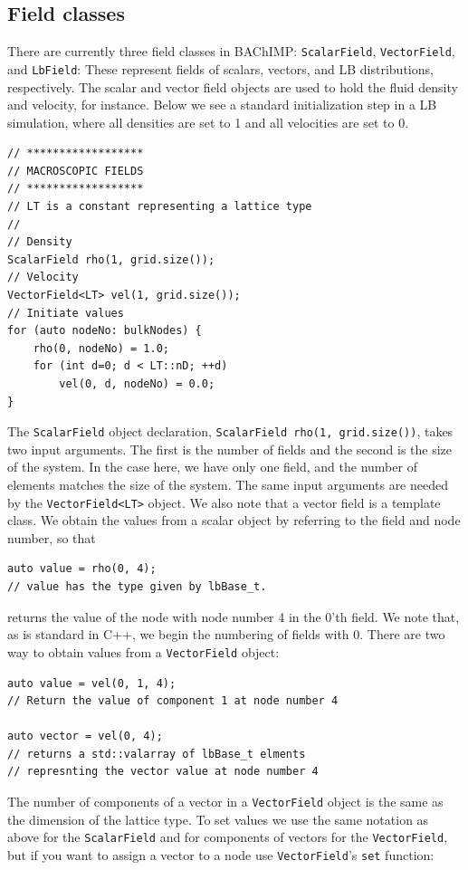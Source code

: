 \documentclass[11pt,a4paper]{report}
\begin{document}
\subsection{Field classes}
\label{sec:field classes}
There are currently three field classes in BAChIMP: \texttt{ScalarField}, \texttt{VectorField}, and \texttt{LbField}: These represent fields of scalars, vectors, and LB distributions, respectively. The scalar and vector field objects are used to hold the fluid density and velocity, for instance. Below we see a standard initialization step in a LB simulation, where all densities are set to 1 and all velocities are set to 0.
\begin{verbatim}
// ******************
// MACROSCOPIC FIELDS
// ******************
// LT is a constant representing a lattice type
//
// Density
ScalarField rho(1, grid.size());
// Velocity
VectorField<LT> vel(1, grid.size());
// Initiate values
for (auto nodeNo: bulkNodes) {
    rho(0, nodeNo) = 1.0;
    for (int d=0; d < LT::nD; ++d)
        vel(0, d, nodeNo) = 0.0;
}
\end{verbatim}
The \texttt{ScalarField} object declaration, \texttt{ScalarField rho(1, grid.size())},  takes two input arguments. The first is the number of fields and the second is the size of the system. In the case here, we have only one field, and the number of elements matches the size of the system. The same input arguments are needed by the \texttt{VectorField<LT>} object. We also note that a vector field is a template class. We obtain the values from a scalar object by referring to the field and node number, so that
\begin{verbatim}
auto value = rho(0, 4);
// value has the type given by lbBase_t.
\end{verbatim}    
returns the value of the node with node number 4 in the 0'th field. We note that, as is standard in C++, we begin the numbering of fields with 0. There are two way to obtain values from a \texttt{VectorField} object:
\begin{verbatim}
auto value = vel(0, 1, 4);
// Return the value of component 1 at node number 4

auto vector = vel(0, 4);
// returns a std::valarray of lbBase_t elments 
// represnting the vector value at node number 4
\end{verbatim}
The number of components of a vector in a \texttt{VectorField} object is the same as the dimension of the lattice type. To set values we use the same notation as above for the \texttt{ScalarField} and for components of vectors for the \texttt{VectorField}, but if you want to assign a vector to a node use \texttt{VectorField}'s \texttt{set} function:
\end{document}
